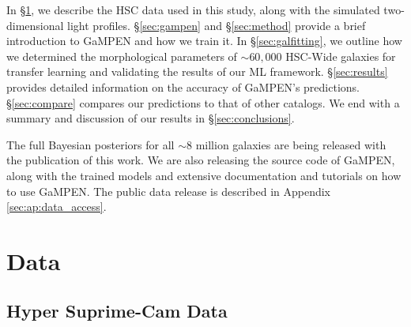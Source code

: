 \documentclass[linenumbers,twocolumn,twocolappendix]{aastex631}
\newcommand\gampen{GaMPEN}
\begin{document}
\begin{CJK*}{UTF8}{gbsn}
In \S \ref{sec:data}, we describe the HSC data used in this study, along with the simulated two-dimensional light profiles. \S \ref{sec:gampen} and \S \ref{sec:method} provide a brief introduction to \gampen{} and how we train it. In \S \ref{sec:galfitting}, we outline how we determined the morphological parameters of $\sim60,000$ HSC-Wide galaxies for transfer learning and validating the results of our ML framework. \S \ref{sec:results} provides detailed information on the accuracy of \gampen{}'s predictions. \S \ref{sec:compare} compares our predictions to that of other catalogs. We end with a summary and discussion of our results in \S \ref{sec:conclusions}.

The full Bayesian posteriors for all $\sim 8$ million galaxies are being released with the publication of this work. We are also releasing the source code of \gampen{}, along with the trained models and extensive documentation and tutorials on how to use \gampen{}. The public data release is described in Appendix \ref{sec:ap:data_access}.

\section{Data} \label{sec:data}

\subsection{Hyper Suprime-Cam Data} \label{sec:hsc_data}


\end{CJK*}
\end{document}

